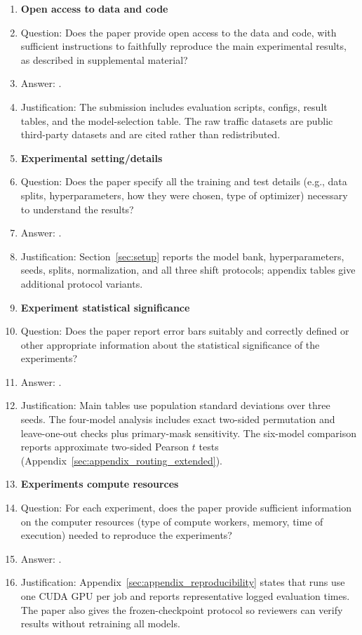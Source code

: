 \begin{enumerate}
\item {\bf Open access to data and code}
    \item[] Question: Does the paper provide open access to the data and code, with sufficient instructions to faithfully reproduce the main experimental results, as described in supplemental material?
    \item[] Answer: \answerYes{}.
    \item[] Justification: The submission includes evaluation scripts, configs, result tables, and the model-selection table. The raw traffic datasets are public third-party datasets and are cited rather than redistributed.

\item {\bf Experimental setting/details}
    \item[] Question: Does the paper specify all the training and test details (e.g., data splits, hyperparameters, how they were chosen, type of optimizer) necessary to understand the results?
    \item[] Answer: \answerYes{}.
    \item[] Justification: Section~\ref{sec:setup} reports the model bank, hyperparameters, seeds, splits, normalization, and all three shift protocols; appendix tables give additional protocol variants.

\newpage
\item {\bf Experiment statistical significance}
    \item[] Question: Does the paper report error bars suitably and correctly defined or other appropriate information about the statistical significance of the experiments?
    \item[] Answer: \answerYes{}.
    \item[] Justification: Main tables use population standard deviations over three seeds. The four-model analysis includes exact two-sided permutation and leave-one-out checks plus primary-mask sensitivity. The six-model comparison reports approximate two-sided Pearson $t$ tests (Appendix~\ref{sec:appendix_routing_extended}).

\item {\bf Experiments compute resources}
    \item[] Question: For each experiment, does the paper provide sufficient information on the computer resources (type of compute workers, memory, time of execution) needed to reproduce the experiments?
    \item[] Answer: \answerYes{}.
    \item[] Justification: Appendix~\ref{sec:appendix_reproducibility} states that runs use one CUDA GPU per job and reports representative logged evaluation times. The paper also gives the frozen-checkpoint protocol so reviewers can verify results without retraining all models.


\end{enumerate}
